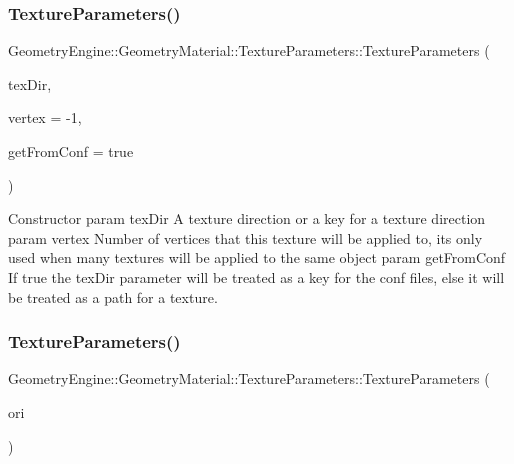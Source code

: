 \subsubsection{\texorpdfstring{TextureParameters()}{TextureParameters()}\hspace{0.1cm}{\footnotesize\ttfamily [1/2]}}
{\footnotesize\ttfamily Geometry\+Engine\+::\+Geometry\+Material\+::\+Texture\+Parameters\+::\+Texture\+Parameters (\begin{DoxyParamCaption}\item[{const std\+::string \&}]{tex\+Dir,  }\item[{int}]{vertex = {\ttfamily -\/1},  }\item[{bool}]{get\+From\+Conf = {\ttfamily true} }\end{DoxyParamCaption})\hspace{0.3cm}{\ttfamily [inline]}}

Constructor param tex\+Dir A texture direction or a key for a texture direction param vertex Number of vertices that this texture will be applied to, its only used when many textures will be applied to the same object param get\+From\+Conf If true the tex\+Dir parameter will be treated as a key for the conf files, else it will be treated as a path for a texture. \mbox{\label{class_geometry_engine_1_1_geometry_material_1_1_texture_parameters_abbda2d6bc0bfc273cd8454acc8b326b7}} 
\subsubsection{\texorpdfstring{TextureParameters()}{TextureParameters()}\hspace{0.1cm}{\footnotesize\ttfamily [2/2]}}
{\footnotesize\ttfamily Geometry\+Engine\+::\+Geometry\+Material\+::\+Texture\+Parameters\+::\+Texture\+Parameters (\begin{DoxyParamCaption}\item[{const \mbox{\hyperlink{class_geometry_engine_1_1_geometry_material_1_1_texture_parameters}{Texture\+Parameters}} \&}]{ori }\end{DoxyParamCaption})\hspace{0.3cm}{\ttfamily [inline]}}


